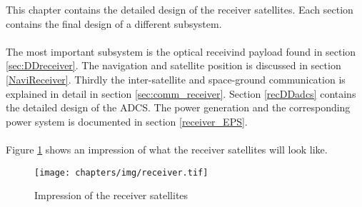 This chapter contains the detailed design of the receiver satellites. Each section contains the final design of a different subsystem. 
\\\\
The most important subsystem is the optical receivind payload found in section \ref{sec:DDreceiver}. The navigation and satellite position is discussed in section \ref{NaviReceiver}. Thirdly the inter-satellite and space-ground communication is explained in detail in section \ref{sec:comm_receiver}. Section \ref{recDDadcs} contains the detailed design of the \ac{ADCS}. The power generation and the corresponding power system is documented in section \ref{receiver_EPS}. 
\\\\
Figure \ref{fig:receiverSat} shows an impression of what the receiver satellites will look like.

\begin{figure}
\texttt{[image: chapters/img/receiver.tif]}
\caption{Impression of the receiver satellites}
\label{fig:receiverSat}
\end{figure}